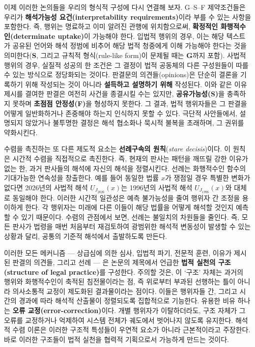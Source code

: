\documentclass[12pt,a4paper]{article}
\begin{document}
이제 이러한 논의들을 우리의 형식적 구성에 다시 연결해 보자. G--S--F
제약조건들은 우리가 \textbf{해석가능성 요건(interpretability
requirements)}이라 부를 수 있는 사항을 포함한다. 즉, 행위는 명료하고
이미 알려진 관행에 위치함으로써, \textbf{확정적인 화행적수인(determinate
uptake)}이 가능해야 한다. 입법적 행위의 경우, 이는 해당 텍스트가 공유된
언어와 해석 정범에 비추어 해당 법적 청중에게 이해 가능해야 한다는 것을
의미한다(\textbf{S}, 그리고 규칙적 형식(rule-like form)이 문제될 때는
\textbf{G}까지 포함). 사법적 행위의 경우, 실질적 성공의 한 조건은 그
결정이 법적 공동체의 다른 구성원들이 따를 수 있는 방식으로 정당화되는
것이다. 판결문의 의견들(opinions)은 단순히 결론을 기록하기 위해 작성되는
것이 아니라 \textbf{설득하고 설명하기 위해} 작성된다. 이와 같은 이유
제시를 결여한 판결은 여전히 사건을 종결시킬 수는 있지만,
\textbf{공유가능성(S)}을 충족하지 못하며 \textbf{초점점 안정성(F)}을
형성하지 못한다. 그 결과, 법적 행위자들은 그 판결을 어떻게 일반화하거나
존중해야 하는지 인식하지 못할 수 있다. 극단적 사안들에서, 설명되지
않았거나 불투명한 결정은 해석 협소화나 묵시적 불복을 초래하며, 그 권위를
약화시킨다.

수렴을 촉진하는 또 다른 제도적 요소는 \textbf{선례구속의
원칙}(\emph{stare decisis})이다. 이 원칙은 시간적 수렴을 직접적으로
촉진한다. 즉, 현재의 판사는 패턴을 깨뜨릴 강한 이유가 없는 한, 과거
판사들의 해석에 자신의 해석을 정렬시킨다. 선례는 화행적수인 함수의
기대가능한 연속성을 창출한다. 예를 들어 동일한 법률 \(x\)가 쟁점일 경우
특별한 변화가 없다면 2026년의 사법적 해석 \(U_{J_{2026}}(x)\)는 1996년의
사법적 해석 \(U_{J_{1996}}(x)\)와 대체로 동일해야 한다. 이러한 시간적
일관성은 예측 불가능성을 줄여 행위자 간 조정을 용이하게 한다. 각
행위자는 미래에 다른 이들이 해당 법률을 어떻게 해석할 것인지 예측할 수
있기 때문이다. 수렴의 관점에서 보면, 선례는 불일치의 차원들을 줄인다.
즉, 모든 판사가 법령을 매번 처음부터 재검토하여 광범위한 해석적 변동성이
발생할 수 있는 상황과 달리, 공통의 기준적 해석에서 출발하도록 만든다.

이러한 모든 메커니즘 --- 상급심에 의한 심사, 입법적 파기, 전문적 훈련,
이유가 제시된 판결의 의견들, 그리고 선례 --- 은 논문의 제목에서 언급한
\textbf{법적 실천의 구조(structure of legal practice)}를 구성한다.
주의할 것은, 이 `구조' 자체는 과거의 행위와 화행적수인이 축적된
침전물이라는 점, 즉 위로부터 부과된 선행하는 틀이 아니라 의사소통적
교정이 제도화된 결과물이라는 점이다. 이들은 행위자들 간, 그리고 시간의
경과에 따라 해석적 산출물이 정렬되도록 집합적으로 기능한다. 유용한 비유
하나는 \textbf{오류 교정(error-correction)}이다. 개별 행위자가
이탈하더라도, 구조 자체가 그 오류를 교정하거나 억제하여 시스템 전체가
궤도에서 벗어나지 않도록 유지한다. 해석적 수렴 이론은 이러한 구조적
특성들이 우연적 요소가 아니라 근본적이라고 주장한다. 바로 이러한
구조들이 법적 실천을 협력적 기획으로서 가능하게 만드는 것이다.
\end{document}
